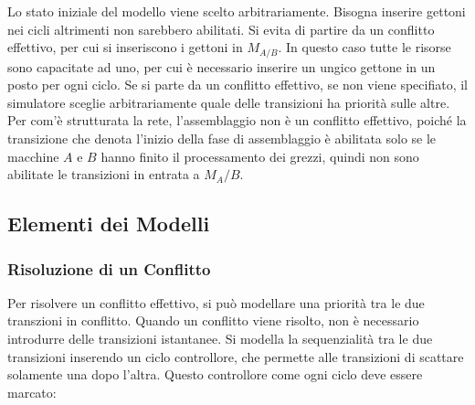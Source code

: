 \documentclass{article}
\numberwithin{equation}{subsection}
\begin{document}
\begin{center}
\end{center}

Lo stato iniziale del modello viene scelto arbitrariamente. Bisogna inserire gettoni nei cicli altrimenti non sarebbero abilitati. Si evita di partire da un conflitto 
effettivo, per cui si inseriscono i gettoni in $M_{A/B}$. In questo caso tutte le risorse sono capacitate ad uno, per cui è necessario inserire un ungico gettone in un 
posto per ogni ciclo. Se si parte da un conflitto effettivo, se non viene specifiato, il simulatore sceglie arbitrariamente quale delle transizioni ha priorità sulle 
altre. Per com'è strutturata la rete, l'assemblaggio non è un conflitto effettivo, poiché la transizione che denota l'inizio della fase di assemblaggio è abilitata solo se 
le macchine $A$ e $B$ hanno finito il processamento dei grezzi, quindi non sono abilitate le transizioni in entrata a $M_A/B$. 

\subsection{Elementi dei Modelli}
\subsubsection{Risoluzione di un Conflitto}

Per risolvere un conflitto effettivo, si può modellare una priorità tra le due transzioni in conflitto. Quando un conflitto viene risolto, non è necessario 
introdurre delle transizioni istantanee. 
Si modella la sequenzialità tra le due transizioni inserendo un ciclo controllore, che permette alle transizioni di scattare solamente una dopo l'altra. Questo 
controllore come ogni ciclo deve essere marcato: 
\end{document}
